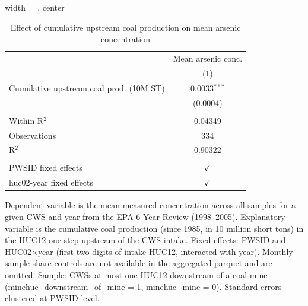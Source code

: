
\begin{table}[htbp]
   
   \caption{\label{tab:6yr_huc02fe_arsenic_mean} Effect of cumulative upstream coal production on mean arsenic concentration}
   \bigskip
   
   \centering
   
   \begin{adjustbox}{width = \textwidth, center}
      
      
      \begin{tabular}{lc}
         \toprule
         
                                                 & Mean arsenic conc.\\  
         
                                                 & (1)\\  
         
         \midrule 
         Cumulative upstream coal prod. (10M ST) & 0.0033$^{***}$\\   
                                                 & (0.0004)\\   
         
          \\
         
         Within R$^2$                            & 0.04349\\  
         Observations                            & 334\\  
         R$^2$                                   & 0.90322\\  
         
          \\
         
         PWSID fixed effects                     & $\checkmark$\\   
         huc02-year fixed effects                & $\checkmark$\\   
         
         \bottomrule
         
      \end{tabular}
      
      
      
   \end{adjustbox}
      {\tiny\linespread{1}\selectfont \par \raggedright 
   Dependent variable is the mean measured concentration across all samples for a given CWS and year from the EPA 6-Year Review (1998--2005). Explanatory variable is the cumulative coal production (since 1985, in 10 million short tons) in the HUC12 one step upstream of the CWS intake. Fixed effects: PWSID and HUC02$\times$year (first two digits of intake HUC12, interacted with year). Monthly sample-share controls are not available in the aggregated parquet and are omitted. Sample: CWSs at most one HUC12 downstream of a coal mine (minehuc\_downstream\_of\_mine = 1, minehuc\_mine = 0). Standard errors clustered at PWSID level.}
   
\end{table}


